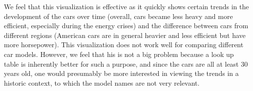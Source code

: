 \documentclass{article}[10pt]
\begin{document}
We feel that this visualization is effective as it quickly shows certain trends
in the development of the cars over time (overall, cars became less heavy and
more efficient, especially during the energy crises) and the difference between
cars from different regions (American cars are in general heavier and less
efficient but have more horsepower). This visualization does not work well for
comparing different car models. However, we feel that his is not a big problem
because a look up table is inherently better for such a purpose, and since the
cars are all at least 30 years old, one would presumably be more interested in
viewing the trends in a historic context, to which the model names are not very
relevant.
\end{document}
